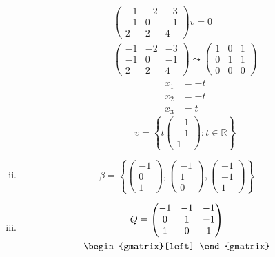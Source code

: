 \begin{enumerate}
\begin{enumerate}[(i)]
\begin{itemize}
\begin{gather}
\begin{pmatrix}
-1 & -2 & -3\\
-1 & 0  & -1\\
2 & 2 & 4
\end{pmatrix}v = 0\\
\begin{pmatrix}
-1 & -2 & -3\\
-1 & 0  & -1\\
2 & 2 & 4
\end{pmatrix}
\leadsto
\begin{pmatrix}
1 & 0 & 1\\
0 & 1 & 1\\
0 & 0 & 0
\end{pmatrix}
\end{gather}
\begin{align}
x_1 &= -t\\
x_2 &= -t\\
x_3 &= t
\end{align}
\begin{equation}
v= \left\{t\begin{pmatrix}-1\\-1\\1\end{pmatrix}\colon t \in \mathbb{R}\right\}
\end{equation}
\end{itemize}
\item \begin{equation}
\beta = \left\{\begin{pmatrix}-1\\0\\1\end{pmatrix},\begin{pmatrix}-1\\1\\0\end{pmatrix},\begin{pmatrix}-1\\-1\\1\end{pmatrix}\right\}
  \end{equation}
\item \begin{gather}
Q = \begin{pmatrix}
-1 & -1 & -1\\
0 & 1 & -1\\
1 & 0 & 1
\end{pmatrix}\\
\begin{gmatrix}[left]

\end{gmatrix}
\end{gather}
\end{enumerate}
\end{enumerate}
